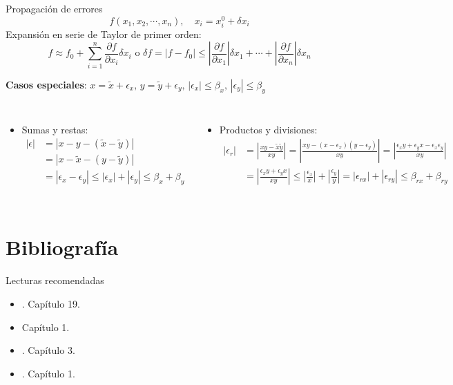 \documentclass[9pt, aspectratio=169]{beamer}
\begin{document}
\begin{frame}{Propagación de errores}
    \[ f(x_1, x_2, \cdots, x_n), \quad x_i = x_i^0 + \delta x_i \]
Expansión en serie de Taylor de primer orden:
\[ f \approx f_0 + \sum_{i = 1}^n \frac{\partial f}{\partial x_i} \delta x_i \text{ o } \delta f =|f - f_0| \leq \left| \frac{\partial f}{\partial x_1} \right| \delta x_1 + \cdots + \left| \frac{\partial f}{\partial x_n} \right| \delta x_n \]

\textbf{Casos especiales}: $x = \tilde{x} + \epsilon_x, \, y = \tilde{y} + \epsilon_y, \, |\epsilon_x| \leq \beta_x, \, |\epsilon_y| \leq \beta_y$ 
\begin{columns}[t]
\begin{itemize}
    \item Sumas y restas:
        \begin{align*}
        |\epsilon| &= |x - y - (\tilde{x} - \tilde{y}) | \\
                   &= |x - \tilde{x} - (y - \tilde{y}) | \\
                   &= |\epsilon_x - \epsilon_y| \leq |\epsilon_x| + |\epsilon_y| \leq \beta_x + \beta_y
        \end{align*}
\end{itemize}

\begin{itemize}
    \item Productos y divisiones:
        \begin{align*}
        |\epsilon_r| &= \left| \frac{x y - \tilde{x} \tilde{y}}{xy} \right| = \left| \frac{x y - (x - \epsilon_x)(y - \epsilon_y)}{xy} \right| = \left| \frac{\epsilon_x y + \epsilon_y x - \epsilon_x \epsilon_y}{xy} \right|\\
                     &= \left| \frac{\epsilon_x y + \epsilon_y x}{xy} \right| \leq \left| \frac{\epsilon_x}{x} \right| + \left| \frac{\epsilon_y}{y} \right| = |\epsilon_{rx}| + |\epsilon_{ry} | \leq \beta_{rx} + \beta_{ry} 
        \end{align*}

\end{itemize}

\end{columns}
\end{frame}

\section*{Bibliografía}
\begin{frame}[allowframebreaks]{Lecturas recomendadas}
\begin{itemize}
 \item {}. Capítulo 19.
 \item {} Capítulo 1.
 \item {}. Capítulo 3.
 \item {}. Capítulo 1.
\end{itemize}
\end{frame}
\end{document}
